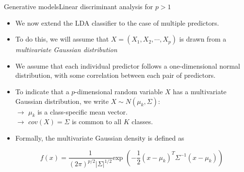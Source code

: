 \begin{frame}{Generative models}{Linear discriminant analysis for $p > 1$}

\begin{itemize}
    \item We now extend the LDA classifier to the case of multiple predictors. \pause
    
    \item To do this, we will assume that $X = (X_1 , X_2 , \cdots , X_p )$ is drawn from a \textit{multivariate Gaussian distribution} \pause

    \item We assume that each individual predictor follows a one-dimensional normal distribution, with some correlation between each pair of predictors. \pause

    \item To indicate that a $p$-dimensional random variable $X$ has a multivariate Gaussian distribution, we write $X \sim N (\mu_k, \Sigma)$: \pause \\ $\rightarrow$ $\mu_k$ is a class-specific mean vector. \pause
    \\ $\rightarrow$ $cov(X) = \Sigma$ is common to all $K$ classes. \pause
    
    \item Formally, the multivariate Gaussian density is defined as \pause 

    \begin{equation}
        f(x) = \frac{1}{(2\pi)^{p/2} |\Sigma|^{1/2}} \text{exp } \left( -\frac{1}{2} (x-\mu_k)^T \Sigma^{-1} (x-\mu_k) \right) 
    \end{equation}
    
\end{itemize}
    
\end{frame}

